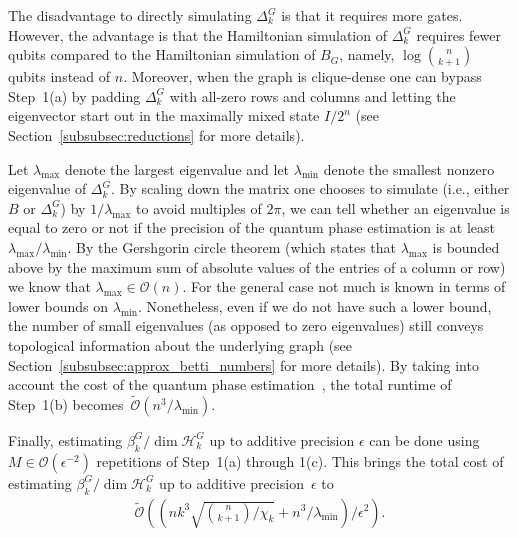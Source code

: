 \documentclass[a4paper, onecolumn, accepted=2022-08-28]{quantumarticle}
\newcommand{\bigO}[1]{\mathcal{O}\left( #1 \right)}
\newcommand{\bOt}[1]{\widetilde{\mathcal O}\left(#1\right)}
\begin{document}
The disadvantage to directly simulating $\Delta_k^G$ is that it requires more gates.
However, the advantage is that the Hamiltonian simulation of $\Delta_k^G$ requires fewer qubits compared to the Hamiltonian simulation of $B_G$, namely, $\log\binom{n}{k+1}$ qubits instead of $n$.
Moreover, when the graph is clique-dense one can bypass Step~1(a) by padding $\Delta_k^G$ with all-zero rows and columns and letting the eigenvector start out in the maximally mixed state $I/2^n$ (see Section~\ref{subsubsec:reductions} for more details).

Let $\lambda_{\mathrm{max}}$ denote the largest eigenvalue and let $\lambda_{\mathrm{min}}$ denote the smallest nonzero eigenvalue of $\Delta_k^G$. 
By scaling down the matrix one chooses to simulate (i.e., either $B$ or $\Delta_k^G$) by $1/\lambda_{\mathrm{max}}$ to avoid multiples of $2\pi$, we can tell whether an eigenvalue is equal to zero or not if the precision of the quantum phase estimation is at least $\lambda_{\mathrm{max}}/ \lambda_{\mathrm{min}}$.
By the Gershgorin circle theorem (which states that $\lambda_{\mathrm{max}}$ is bounded above by the maximum sum of absolute values of the entries of a column or row) we know that $\lambda_{\mathrm{max}} \in \bigO{n}$. 
For the general case not much is known in terms of lower bounds on $\lambda_{\mathrm{min}}$.
Nonetheless, even if we do not have such a lower bound, the number of small eigenvalues (as opposed to zero eigenvalues) still conveys topological information about the underlying graph (see Section~\ref{subsubsec:approx_betti_numbers} for more details).
By taking into account the cost of the quantum phase estimation~\cite{n&c}, the total runtime of Step~1(b) becomes~$\bOt{n^3/\lambda_{\mathrm{min}}}$.

Finally, estimating $\beta_k^G/\dim \mathcal{H}_k^G$ up to additive precision $\epsilon$ can be done using $M \in \bigO{\epsilon^{-2}}$ repetitions of Step~1(a) through 1(c).
This brings the total cost of estimating $\beta_k^G/\dim \mathcal{H}_k^G$ up to additive precision~$\epsilon$ to
\begin{align*}
  \bOt{\left(nk^3\sqrt{\binom{n}{k+1}/\chi_k} + n^3/\lambda_{\mathrm{min}} \right)/\epsilon^2}.
\end{align*}
\end{document}
